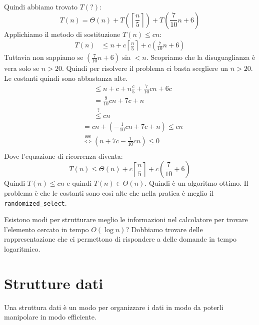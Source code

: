 \documentclass[a4paper]{article}
\begin{document}
\begin{enumerate}
    \vspace{1em}
    \noindent
    Quindi abbiamo trovato \( T(?) \):
    \[
      T(n) = \Theta (n) + T\left(\left\lceil \frac{n}{5} \right\rceil\right) + T\left(\frac{7}{10} n + 6\right)
    \] 
    Applichiamo il metodo di sostituzione \( T(n) \le cn \):
    \[
      \begin{aligned}
        T(n) &\le n + c \left\lceil \frac{n}{5} \right\rceil + c \left( \frac{7}{10}
        n + 6\right) \end{aligned}
    \]
    Tuttavia non sappiamo se $\left(\frac{7}{10}n + 6\right)$ sia $< n$. Scopriamo che la disuguaglianza è vera 
    solo se $n > 20$. Quindi per risolvere il problema ci basta scegliere un $\overline{n} > 20$. Le costanti quindi
    sono abbastanza alte. 
    \[
        \begin{aligned}
             & \le n + c + n \frac{c}{5} + \frac{7}{10} cn + 6c \\
             &= \frac{9}{10}cn + 7c + n \\
             & \stackrel{?}{\le} cn 
      \end{aligned}
    \] 
    \[
      \begin{aligned}
        &=  cn + \left(- \frac{1}{10}cn + 7c + n\right) \le cn \\
        &\stackrel{\text{sse}}{\Longleftrightarrow} \left(n + 7c - \frac{1}{10}cn\right)\le 0\\
      \end{aligned}
    \] 
    Dove l'equazione di ricorrenza diventa: 
    \[T(n) \le \Theta(n) + c\left\lceil\frac{n}{5}\right\rceil + c\left(\frac{7}{10} + 6\right)\] 
    Quindi \( T(n) \le cn \) e quindi \( T(n) \in \Theta(n) \). Quindi è un algoritmo ottimo. 
    Il problema è che le costanti sono così alte che nella pratica è meglio il \texttt{randomized\_select}.
\end{enumerate}
Esistono modi per strutturare meglio le informazioni nel calcolatore 
per trovare l'elemento cercato in tempo $O(\log n)$? Dobbiamo trovare delle rappresentazione
che ci permettono di rispondere a delle domande in tempo logaritmico. 

\pagebreak

\section{Strutture dati}

Una struttura dati è un modo per organizzare i dati in modo da poterli manipolare in modo efficiente.
\end{document}
